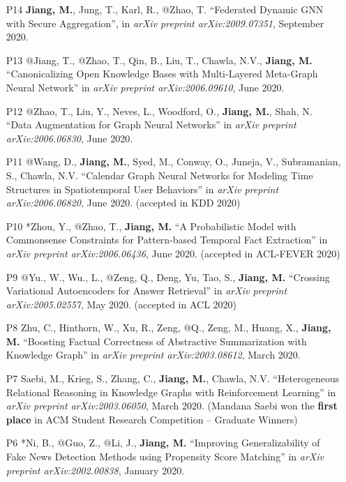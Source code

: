 \documentclass[10pt]{article}
\newenvironment{myindentpar}[1]%
{\begin{list}{}%
         {\setlength{\leftmargin}{#1}}%
         \item[]%
}
{\end{list}}
\newcounter{list}
\begin{document}
\begin{myindentpar}{0.00cm}
\begin{enumerate}[leftmargin=.5cm]
\item[P14] \textbf{Jiang, M.}, Jung, T., Karl, R., @Zhao, T. ``Federated Dynamic GNN with Secure Aggregation'', in \textit{arXiv preprint arXiv:2009.07351}, September 2020.
		
\item[P13] @Jiang, T., @Zhao, T., Qin, B., Liu, T., Chawla, N.V., \textbf{Jiang, M.} ``Canonicalizing Open Knowledge Bases with Multi-Layered Meta-Graph Neural Network'' in \textit{arXiv preprint arXiv:2006.09610}, June 2020.
		
\item[P12] @Zhao, T., Liu, Y., Neves, L., Woodford, O., \textbf{Jiang, M.}, Shah, N. ``Data Augmentation for Graph Neural Networks'' in \textit{arXiv preprint arXiv:2006.06830}, June 2020.

\item[P11] @Wang, D., \textbf{Jiang, M.}, Syed, M., Conway, O., Juneja, V., Subramanian, S., Chawla, N.V. ``Calendar Graph Neural Networks for Modeling Time Structures in Spatiotemporal User Behaviors'' in \textit{arXiv preprint arXiv:2006.06820}, June 2020. (accepted in KDD 2020)
		
\item[P10] *Zhou, Y., @Zhao, T., \textbf{Jiang, M.} ``A Probabilistic Model with Commonsense Constraints for Pattern-based Temporal Fact Extraction'' in \textit{arXiv preprint arXiv:2006.06436}, June 2020. (accepted in ACL-FEVER 2020)

\item[P9] @Yu., W., Wu., L., @Zeng, Q., Deng, Yu, Tao, S., \textbf{Jiang, M.} ``Crossing Variational Autoencoders for Answer Retrieval'' in \textit{arXiv preprint arXiv:2005.02557}, May 2020. (accepted in ACL 2020)
		
\item[P8] Zhu, C., Hinthorn, W., Xu, R., Zeng, @Q., Zeng, M., Huang, X., \textbf{Jiang, M.} ``Boosting Factual Correctness of Abstractive Summarization with Knowledge Graph'' in \textit{arXiv preprint arXiv:2003.08612}, March 2020.

\item[P7] Saebi, M., Krieg, S., Zhang, C., \textbf{Jiang, M.}, Chawla, N.V. ``Heterogeneous Relational Reasoning in Knowledge Graphs with Reinforcement Learning'' in \textit{arXiv preprint arXiv:2003.06050}, March 2020. (Mandana Saebi won the \textbf{first place} in ACM Student Research Competition -- Graduate Winners)

\item[P6] *Ni, B., @Guo, Z., @Li, J., \textbf{Jiang, M.} ``Improving Generalizability of Fake News Detection Methods using Propensity Score Matching'' in \textit{arXiv preprint arXiv:2002.00838}, January 2020.
		

\end{enumerate}
\end{myindentpar}
\end{document}
